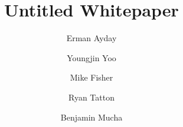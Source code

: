 \title{Untitled Whitepaper}

\author{
    Erman Ayday \and
    Youngjin Yoo \and
    Mike Fisher \and
    Ryan Tatton \and
    Benjamin Mucha
}


\maketitle

\begin{abstract}
\end{abstract}